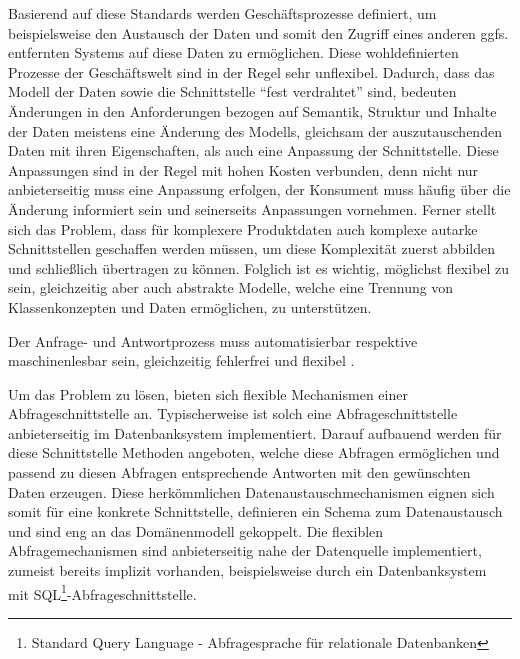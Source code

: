 Basierend auf diese Standards werden Geschäftsprozesse definiert, um beispielsweise den Austausch der Daten und somit den Zugriff eines anderen ggfs. entfernten Systems auf diese Daten zu ermöglichen. Diese wohldefinierten Prozesse  der Geschäftswelt sind in der Regel sehr unflexibel. Dadurch, dass das Modell der Daten sowie die Schnittstelle \enquote{fest verdrahtet} sind, bedeuten Änderungen in den Anforderungen bezogen auf Semantik, Struktur und Inhalte der Daten meistens eine Änderung des Modells, gleichsam der auszutauschenden Daten mit ihren Eigenschaften, als auch eine Anpassung der Schnittstelle. Diese Anpassungen sind in der Regel mit hohen Kosten verbunden, denn nicht nur anbieterseitig muss eine Anpassung erfolgen, der Konsument muss häufig über die Änderung informiert sein und seinerseits Anpassungen vornehmen. 
Ferner stellt sich das Problem, dass für komplexere Produktdaten auch komplexe autarke Schnittstellen geschaffen werden müssen, um diese Komplexität zuerst abbilden und schließlich übertragen zu können.  
Folglich ist es wichtig, möglichst flexibel zu sein, gleichzeitig aber auch abstrakte Modelle, welche eine Trennung von Klassenkonzepten und Daten ermöglichen, zu unterstützen. 

Der Anfrage- und Antwortprozess muss automatisierbar respektive maschinenlesbar sein, gleichzeitig fehlerfrei und flexibel \citep[vgl.][]{uiterwykEclass}.


Um das Problem zu lösen, bieten sich flexible Mechanismen einer \gls{Abfrageschnittstelle} an. Typischerweise ist solch eine \gls{Abfrageschnittstelle} anbieterseitig im Datenbanksystem implementiert. Darauf aufbauend werden für diese Schnittstelle Methoden angeboten, welche diese Abfragen ermöglichen und passend zu diesen Abfragen entsprechende Antworten mit den gewünschten Daten erzeugen. 
Diese herkömmlichen Datenaustauschmechanismen eignen sich somit für eine konkrete Schnittstelle, definieren ein Schema zum Datenaustausch und sind eng an das Domänenmodell gekoppelt. Die flexiblen Abfragemechanismen sind anbieterseitig nahe der Datenquelle implementiert, zumeist bereits implizit vorhanden, beispielsweise durch ein Datenbanksystem mit SQL\footnote{Standard Query Language - Abfragesprache für relationale Datenbanken}-Abfrageschnittstelle. 

